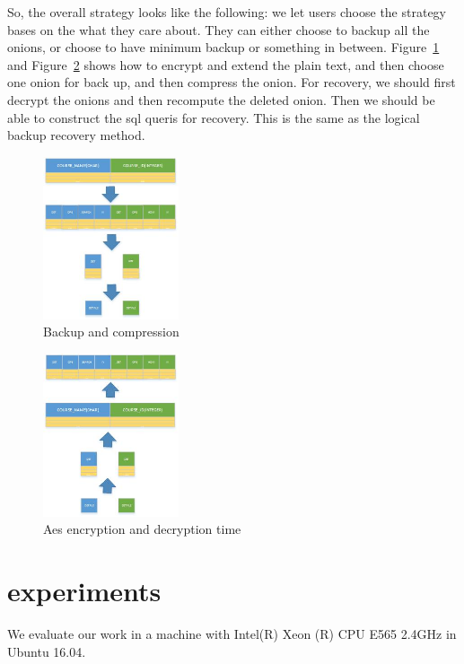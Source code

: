So, the overall strategy looks like the following: we let users choose the strategy bases on the what they care about. They can either choose to backup all the onions, or choose to have minimum backup or something in between. Figure~\ref{fig:stack7} and Figure~\ref{fig:stack8} shows how to encrypt and extend the plain text, and then choose one onion for back up, and then compress the onion. For recovery, we should first decrypt the onions and then recompute the deleted onion. Then we should be able to construct the sql queris for recovery. This is the same as the logical backup recovery method.

\begin{figure}[tb]
\centering
\includegraphics[width=4cm]{images/Workflow.jpg}
\caption{Backup and compression}
\label{fig:stack7}
\end{figure}


\begin{figure}[tb]
\centering
\includegraphics[width=4cm]{images/Recovery.jpg}
\caption{Aes encryption and decryption time}
\label{fig:stack8}
\end{figure}









\section{experiments}

We evaluate our work in a machine with Intel(R) Xeon (R) CPU E565 2.4GHz in Ubuntu 16.04. 


